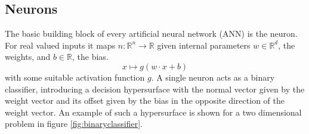 
%



\subsection{Neurons}
\label{sec:Neurons}
The basic building block of every artificial neural network (ANN) is the neuron. For real valued inputs it maps $n: \mathbb{R}^n \rightarrow \mathbb{R}$ given internal parameters $w \in \mathbb{R}^d$, the weights, and $b \in \mathbb{R}$, the bias.
\begin{equation}
x \mapsto g(w \cdot x + b)
\end{equation}
with some suitable activation function $g$. A single neuron acts as a binary classifier, introducing a decision hypersurface with the normal vector given by the weight vector and its offset given by the bias in the opposite direction of the weight vector. An example of such a hypersurface is shown for a two dimensional problem in figure \ref{fig:binaryclassifier}. \\

